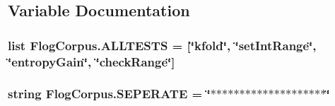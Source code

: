 \subsection{Variable Documentation}
\hypertarget{namespaceFlogCorpus_a04921d2c9ac432c32b739f901d16ddd2}{
\subsubsection[{A\-L\-L\-T\-E\-S\-T\-S}]{\setlength{\rightskip}{0pt plus 5cm}list Flog\-Corpus.\-A\-L\-L\-T\-E\-S\-T\-S = \mbox{[}\char`\"{}kfold\char`\"{}, \char`\"{}set\-Int\-Range\char`\"{}, \char`\"{}entropy\-Gain\char`\"{}, \char`\"{}check\-Range\char`\"{}\mbox{]}}}\label{namespaceFlogCorpus_a04921d2c9ac432c32b739f901d16ddd2}
\hypertarget{namespaceFlogCorpus_a4c964280a15bad02d7087b10d7f6100a}{
\subsubsection[{S\-E\-P\-E\-R\-A\-T\-E}]{\setlength{\rightskip}{0pt plus 5cm}string Flog\-Corpus.\-S\-E\-P\-E\-R\-A\-T\-E = \char`\"{}$\ast$$\ast$$\ast$$\ast$$\ast$$\ast$$\ast$$\ast$$\ast$$\ast$$\ast$$\ast$$\ast$$\ast$$\ast$$\ast$$\ast$$\ast$$\ast$$\ast$\char`\"{}}}\label{namespaceFlogCorpus_a4c964280a15bad02d7087b10d7f6100a}

